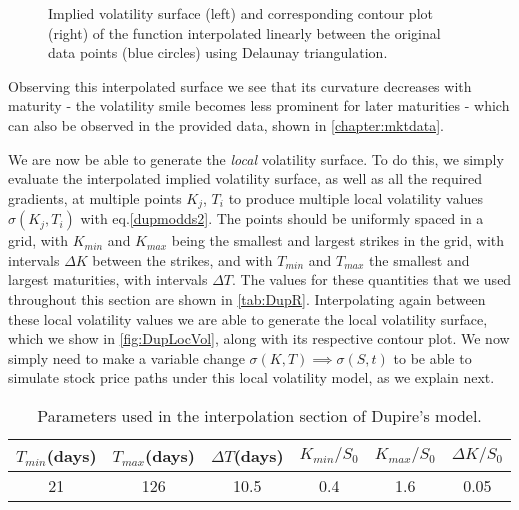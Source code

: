 \begin{figure}[H]
  \begin{subfigmatrix}{2}
  \end{subfigmatrix}
    \caption[Implied volatility surface and corresponding contour plot of the function interpolated linearly between the original data points using Delaunay triangulation.]{Implied volatility surface (left) and corresponding contour plot (right) of the function interpolated linearly between the original data points (blue circles) using Delaunay triangulation.}\label{fig:DupImpV}
\end{figure}   


Observing this interpolated surface we see that its curvature decreases with maturity - the volatility smile becomes less prominent for later maturities - which can also be observed in the provided data, shown in \autoref{chapter:mktdata}.


We are now be able to generate the \emph{local} volatility surface. To do this, we simply evaluate the interpolated implied volatility surface, as well as all the required gradients, at multiple points $K_j$, $T_i$ to produce multiple local volatility values $\sigma(K_j,T_i)$ with eq.\eqref{dupmodds2}. The points should be uniformly spaced in a grid, with $K_{min}$ and $K_{max}$ being the smallest and largest strikes in the grid, with intervals $\Delta K$ between the strikes, and with $T_{min}$ and $T_{max}$ the smallest and largest maturities, with intervals $\Delta T$. The values for these quantities that we used throughout this section are shown in \autoref{tab:DupR}.
Interpolating again between these local volatility values we are able to generate the local volatility surface, which we show in \autoref{fig:DupLocVol}, along with its respective contour plot. We now simply need to make a variable change $\sigma(K,T)\implies \sigma(S,t)$ to be able to simulate stock price paths under this local volatility model, as we explain next.


\begin{table}[H]
    \centering
        \renewcommand{\arraystretch}{0.8}
\begin{tabular}{@{}cccccc@{}}
\toprule
$T_{min}$(days) & $T_{max}$(days) & $\Delta T$(days) & $K_{min}/S_0$ & $K_{max}/S_0$ & \multicolumn{1}{c}{$\Delta K/S_0$}\\ \midrule
21 & 126 & 10.5 & 0.4 & 1.6 & \multicolumn{1}{c}{0.05} \\ \bottomrule
\end{tabular}
  \caption[Parameters used in the interpolation section of Dupire's model.]{Parameters used in the interpolation section of Dupire's model.}
  \label{tab:DupR}
\end{table}


